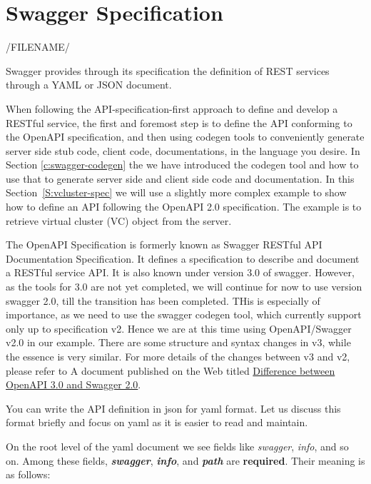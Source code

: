 \section{Swagger Specification}
\label{S:swagger-specification}

/FILENAME/

Swagger provides through its specification the definition of REST
services through a YAML or JSON document. 

When following the API-specification-first approach to define and
develop a RESTful service, the first and foremost step is to define
the API conforming to the OpenAPI specification, and then using
codegen tools to conveniently generate server side stub code, client
code, documentations, in the language you desire. In Section
\ref{c:swagger-codegen} the we have introduced the codegen tool and how to
use that to generate server side and client side code and documentation.
In this Section~\ref{S:vcluster-spec} we will use a slightly more complex
example to show how to define an API following the OpenAPI 2.0 specification.
The example is to retrieve virtual cluster (VC) object from the server.

The OpenAPI Specification is formerly known as Swagger RESTful API
Documentation Specification. It defines a specification to describe
and document a RESTful service API. It is also known under version 3.0
of swagger. However, as the tools for 3.0 are not yet completed, we
will continue for now to use version swagger 2.0, till the transition
has been completed. THis is especially of importance, as we need to
use the swagger codegen tool, which currently support only up to
specification v2. Hence we are at this time using OpenAPI/Swagger v2.0
in our example. There are some structure and syntax changes in v3,
while the essence is very similar. For more details of the
changes between v3 and v2, please refer to A document published on the
Web titled
\href{https://blog.readme.io/an-example-filled-guide-to-swagger-3-2/}{Difference
  between OpenAPI 3.0 and Swagger 2.0}.

You can write the API definition in json for yaml format. Let us
discuss this format briefly and focus on yaml as it is easier to read
and maintain.

On the root level of the yaml document we see fields like
\emph{swagger}, \emph{info}, and so on. Among these fields,
\textbf{\emph{swagger}}, \textbf{\emph{info}}, and \textbf{\emph{path}}
are \textbf{required}. Their meaning is as follows:

